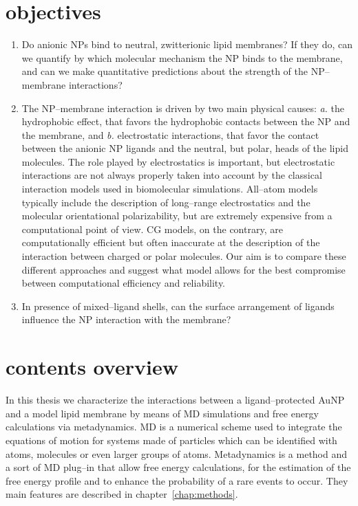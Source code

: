 \section{objectives}
\begin{enumerate}[label=\roman*.]
	\item Do anionic \acp{NP} bind to neutral, zwitterionic lipid membranes? If they do, can we quantify by which molecular mechanism the \ac{NP} binds to the membrane, and can we make quantitative predictions about the strength of the \ac{NP}--membrane interactions?%
	\item The \ac{NP}--membrane interaction is driven by two main physical causes: \textit{a.} the hydrophobic effect, that favors the hydrophobic contacts between the \ac{NP} and the membrane, and \textit{b.} electrostatic interactions, that favor the contact between the anionic \ac{NP} ligands and the neutral, but polar, heads of the lipid molecules. The role played by electrostatics is important, but electrostatic interactions are not always properly taken into account by the classical interaction models used in biomolecular simulations. All--atom models typically include the description of long--range electrostatics and the molecular orientational polarizability, but are extremely expensive from a computational point of view. \ac{CG} models, on the contrary, are computationally efficient but often inaccurate at the description of the interaction between charged or polar molecules. Our aim is to compare these different approaches and suggest what model allows for the best compromise between computational efficiency and reliability.%
	\item In presence of mixed--ligand shells, can the surface arrangement of ligands influence the \ac{NP} interaction with the membrane?%
\end{enumerate}


\section{contents overview}
In this thesis we characterize the interactions between a ligand--protected \ac{AuNP} and a model lipid membrane by means of \ac{MD} simulations and free energy calculations via metadynamics. \ac{MD} is a numerical scheme used to integrate the equations of motion for systems made of particles which can be identified with atoms, molecules or even larger groups of atoms. Metadynamics is a method and a sort of \ac{MD} plug--in that allow free energy calculations, for the estimation of the free energy profile and to enhance the probability of a rare events to occur. They main features are described in chapter~\ref{chap:methods}.

